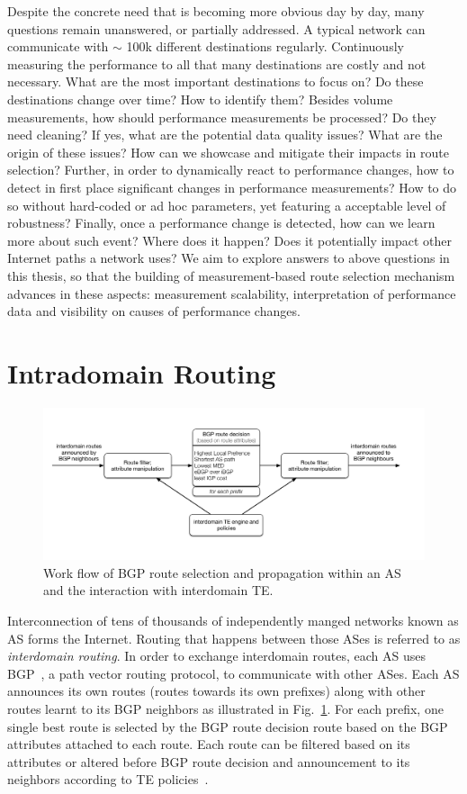 Despite the concrete need that is becoming more obvious day by day, many questions remain unanswered, or partially addressed.
A typical network can communicate with $\sim$ 100k different destinations regularly. 
Continuously measuring the performance to all that many destinations are costly and not necessary. 
What are the most important destinations to focus on? Do these destinations change over time? How to identify them?
Besides volume measurements, how should performance measurements be processed? Do they need cleaning?
If yes, what are the potential data quality issues? What are the origin of these issues? How can we showcase and mitigate their impacts in route selection?
Further, in order to dynamically react to performance changes, how to detect in first place significant changes in performance measurements? How to do so without hard-coded or ad hoc parameters, yet featuring a acceptable level of robustness?
Finally, once a performance change is detected, how can we learn more about such event? Where does it happen? Does it potentially impact other Internet paths a network uses? 
We aim to explore answers to above questions in this thesis, so that the building of measurement-based route selection mechanism advances in these aspects: measurement scalability, interpretation of performance data and visibility on causes of performance changes. 

\section{Intradomain Routing}
\begin{figure}[!htb]
\centering
\includegraphics[width=1.3\textwidth]{gfx/chap1/bgp_decision.pdf}
\caption{Work flow of \ac{BGP} route selection and propagation within an \ac{AS} and the interaction with interdomain \ac{TE}.}
\label{fig:bgp_decision}
\end{figure}

Interconnection of tens of thousands of independently manged networks known as \ac{AS} forms the Internet.
Routing that happens between those ASes is referred to as 
\textit{interdomain routing}.
In order to exchange interdomain routes, each AS uses \ac{BGP}~\cite{bgp4}, a path vector routing protocol, to communicate with other ASes.
Each AS announces its own routes (routes towards its own prefixes) along with other routes learnt to its BGP neighbors as illustrated in Fig.~\ref{fig:bgp_decision}.
For each prefix, one single best route is selected by the BGP route decision route based on the BGP attributes attached to each route.
Each route can be filtered based on its attributes or altered before BGP route decision and announcement to its neighbors according to \ac{TE} policies~\cite{Quoitin2003, Gao2001a}.

